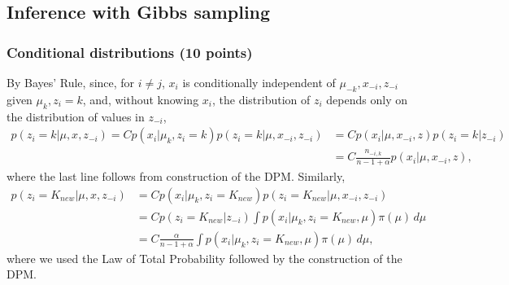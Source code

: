 \documentclass[11pt]{article}
\begin{document}
\subsection{Inference with Gibbs sampling}
\subsubsection{Conditional distributions (10 points)}
By Bayes' Rule, since, for $i \neq j$, $x_i$ is conditionally independent of
$\mu_{-k}, x_{-i},z_{-i}$ given $\mu_k,z_i = k$, and, without knowing $x_i$,
the distribution of $z_i$ depends only on the distribution of values in
$z_{-i}$,
\begin{align*}
p(z_i = k | \mu, x, z_{-i})
    = C p(x_i | \mu_k, z_i = k) p(z_i = k | \mu, x_{-i}, z_{-i})
 &  = C p(x_i | \mu, x_{-i}, z) p(z_i = k | z_{-i}) \\
 &  = C \frac{n_{-i,k}}{n - 1 + \alpha} p(x_i | \mu, x_{-i}, z),
\end{align*}
where the last line follows from construction of the DPM. Similarly,
\begin{align*}
p(z_i = K_{new} | \mu, x, z_{-i})
 &  = C p(x_i | \mu_k, z_i = K_{new}) p(z_i = K_{new} | \mu, x_{-i}, z_{-i}) \\
 &  = C p(z_i = K_{new} | z_{-i})
        \int p(x_i | \mu_k, z_i = K_{new}, \mu) \pi(\mu) \, d\mu \\
 &  = C \frac{\alpha}{n - 1 + \alpha}
        \int p(x_i | \mu_k, z_i = K_{new}, \mu) \pi(\mu) \, d\mu,
\end{align*}
where we used the Law of Total Probability followed by the construction of the
DPM.
\end{document}
